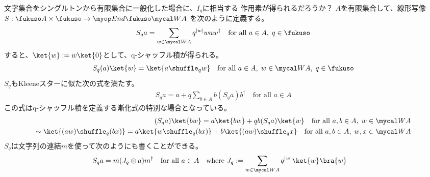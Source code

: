 {\begin{note}[微分方程式]
	\end{note} %
	\begin{note}
	\label{note:q-シャッフル積と$I_q$の関係} %
		文字集合をシングルトンから有限集合に一般化した場合に、$I_q$に相当する
		作用素が得られるだろうか？
		$A$を有限集合して、線形写像$S:\fukuso A\times\fukuso\to\End\fukuso\W A$
		を次のように定義する。
		\begin{equation*}\begin{split}
			S_qa = \sum_{w\in \W A}q^{|w|}waw^\dag
			\quad\text{for all } a\in A,\; q\in\fukuso
		\end{split}\end{equation*}
		すると、$\ket{w}:=w\ket{0}$として、q-シャッフル積が得られる。
		\begin{equation*}\begin{split}
			S_q(a)\ket{w} = \ket{a\shuffle_qw}
			\quad\text{for all } a\in A,\; w\in \W A,\; q\in\fukuso
		\end{split}\end{equation*}
		$S_q$もKleeneスターに似た次の式を満たす。
		\begin{equation*}\begin{split}
			S_qa = a + q\sum_{b\in A}b(S_qa)b^\dag \quad\text{for all } a\in A
		\end{split}\end{equation*}
		この式はq-シャッフル積を定義する漸化式の特別な場合となっている。
		\begin{equation*}\begin{split}
			(S_qa)\ket{bw} = a\ket{bw} + qb(S_qa)\ket{w}
			\quad\text{for all } a,b\in A,\; w\in\W A \\
			\sim \ket{(aw)\shuffle_q(bx)}
			= a\ket{w\shuffle_q(bx)} + b\ket{(aw)\shuffle_qx}
			\quad\text{for all } a,b\in A,\; w,x\in\W A \\
		\end{split}\end{equation*}
		$S_q$は文字列の連結$m$を使って次のようにも書くことができる。
		\begin{equation*}\begin{split}
			S_qa &= m(J_q\otimes a)m^\dag \quad\text{for all } a\in A
			\quad\text{where } J_q := \sum_{w\in\W A} q^{|w|}\ket{w}\bra{w}
		\end{split}\end{equation*}
	\end{note} %
}
